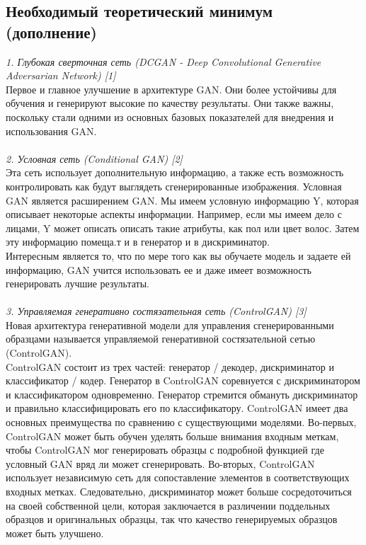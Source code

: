 \documentclass{article}
\begin{document}
    \newpage
    \begin{center} 
    \section{Необходимый теоретический минимум (дополнение)}
    \end{center} 
    \large 
    \textit{1. Глубокая сверточная сеть (DCGAN - Deep Convolutional Generative Adversarian Network) [1]}
    \\
    Первое и главное улучшение в архитектуре GAN. Они более устойчивы для обучения и генерируют высокие по качеству результаты. Они также важны, поскольку стали одними из основных базовых показателей для внедрения и использования GAN. 
    \\ \\
    \textit{2. Условная сеть (Conditional GAN) [2]}
    \\
    Эта сеть использует дополнительную информацию, а также есть возможность контролировать как будут выглядеть сгенерированные изображения. Условная GAN является расширением GAN. Мы имеем условную информацию Y, которая описывает некоторые аспекты информации. Например, если мы имеем дело с лицами, Y может описать описать такие атрибуты, как пол или цвет волос. Затем эту информацию помеща.т и в генератор и в дискриминатор. \\
    Интересным является то, что по мере того как вы обучаете модель и задаете ей информацию, GAN учится использовать ее и даже имеет возможность генерировать лучшие результаты.
    \\ \\
    \textit{3. Управляемая генеративно состязательная сеть (ControlGAN) [3]}
    \\
    Новая архитектура генеративной модели для управления сгенерированными образцами называется управляемой генеративной состязательной сетью (ControlGAN). 
    \\
    ControlGAN состоит из трех частей: генератор / декодер, дискриминатор и классификатор / кодер. Генератор в ControlGAN соревнуется с дискриминатором и классификатором одновременно.
    Генератор стремится обмануть дискриминатор и правильно классифицировать его по классификатору. ControlGAN имеет два основных преимущества по сравнению с существующими моделями. 
    Во-первых, ControlGAN может быть обучен уделять больше внимания входным меткам, чтобы ControlGAN мог генерировать образцы с подробной функцией где условный GAN вряд ли может сгенерировать. Во-вторых, ControlGAN использует независимую сеть для сопоставление элементов в соответствующих входных метках. Следовательно, дискриминатор может больше сосредоточиться на своей собственной цели, которая заключается в различении поддельных образцов и оригинальных образцы, так что качество генерируемых образцов может быть улучшено.
\end{document}
